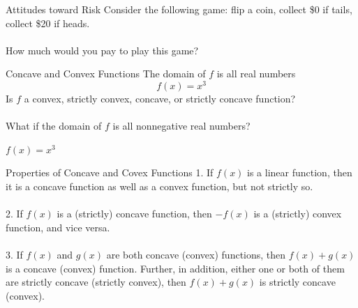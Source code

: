\documentclass{./../../Latex/teaching_slides}
\begin{document}
\begin{frame}{Attitudes toward Risk}
Consider the following game: flip a coin, collect \$0 if tails, collect \$20 if heads. \\~\\
How much would you pay to play this game? 
\end{frame}

\begin{frame}{Concave and Convex Functions}
The domain of $f$ is all real numbers
$$ f(x) = x^3 $$
Is $f$ a convex, strictly convex, concave, or strictly concave function? \\~\\
What if the domain of $f$ is all nonnegative real numbers? 
\end{frame}

\begin{frame}{$f(x)=x^3$}
\begin{center}
\end{center}
\end{frame}

\begin{frame}{Properties of Concave and Covex Functions}
1.  If $f(x)$ is a linear function, then it is a concave function as well as a convex function, but not strictly so. \\~\\

2. If $f(x)$ is a (strictly) concave function, then $-f(x)$ is a (strictly) convex function, and vice versa. \\~\\

3. If $f(x)$ and $g(x)$ are both concave (convex) functions, then $f(x)+g(x)$ is a concave (convex) function. Further, in addition, either one or both of them are strictly concave (strictly convex), then $f(x)+g(x)$ is strictly concave (convex).
\end{frame}
\end{document}

